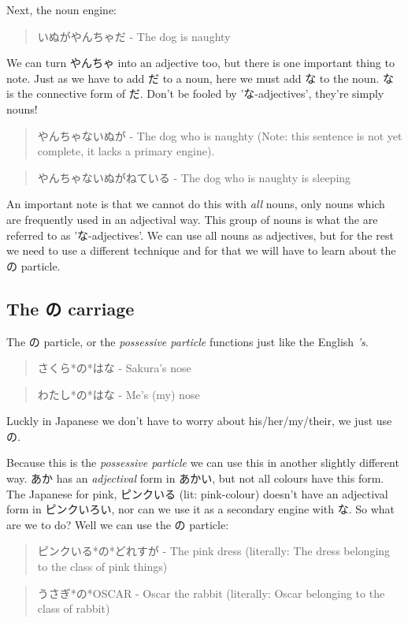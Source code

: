 \documentclass[11pt]{article}
\begin{document}
Next, the noun engine:
\begin{quote}
いぬがやんちゃだ - The dog is naughty
\end{quote}
We can turn やんちゃ into an adjective too, but there is one important thing to note. Just as we have to add だ to a noun, here we must add な to the noun. な is the connective form of だ. Don't be fooled by 'な-adjectives', they're simply nouns!
\begin{quote}
やんちゃないぬが - The dog who is naughty (Note: this sentence is not yet complete, it lacks a primary engine).
\end{quote}
\begin{quote}
やんちゃないぬがねている - The dog who is naughty is sleeping
\end{quote}

An important note is that we cannot do this with \emph{all} nouns, only nouns which are frequently used in an adjectival way. This group of nouns is what the are referred to as 'な-adjectives'. We can use all nouns as adjectives, but for the rest we need to use a different technique and for that we will have to learn about the の particle.

\subsection{The の carriage}
\label{sec:org45f4e94}
The の particle, or the \emph{possessive particle} functions just like the English \emph{'s}.
\begin{quote}
さくら*の*はな - Sakura's nose
\end{quote}
\begin{quote}
わたし*の*はな - Me's (my) nose
\end{quote}
Luckly in Japanese we don't have to worry about his/her/my/their, we just use の.

Because this is the \emph{possessive particle} we can use this in another slightly different way. あか has an \emph{adjectival} form in あかい, but not all colours have this form. The Japanese for pink, ピンクいる (lit: pink-colour) doesn't have an adjectival form in ピンクいろい, nor can we use it as a secondary engine with な. So what are we to do? Well we can use the の particle:
\begin{quote}
ピンクいる*の*どれすが - The pink dress (literally: The dress belonging to the class of pink things)
\end{quote}
\begin{quote}
うさぎ*の*OSCAR - Oscar the rabbit (literally: Oscar belonging to the class of rabbit)
\end{quote}
\end{document}
